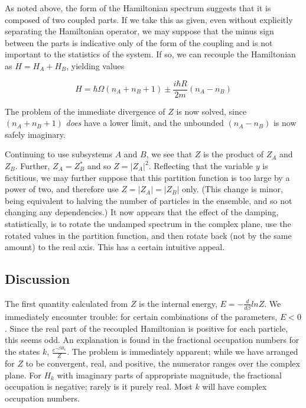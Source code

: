 As noted above, the form of the Hamiltonian spectrum suggests that it is
composed of two coupled parts.  If we take this as given, even without
explicitly separating the Hamiltonian operator, we may suppose that the
minus sign between the parts is indicative only of the form of the coupling
and is not important to the statistics of the system.  If so, we can recouple
the Hamiltonian as $H = H_{A} + H_{B}$, yielding values

\begin{equation}
H = \hbar \Omega (n_{A} + n_{B} + 1) \pm \frac{i \hbar R}{2 m} (n_{A} - n_{B})
\end{equation}

The problem of the immediate divergence of $Z$ is now solved, since $(n_{A} +
n_{B} + 1)$ {\em does} have a lower limit, and the unbounded $(n_{A} - n_{B})$
is now safely imaginary.

Continuing to use subsystems $A$ and $B$, we see
that $Z$ is the product of $Z_{A}$ and $Z_{B}$.  Further, $Z_{A} = Z_{B}^{*}$
and so $Z = |Z_{A}|^{2}$.  Reflecting that the variable $y$ is fictitious, we
may further suppose that this partition function is too large by a power of
two, and therefore use $Z = |Z_{A}| = |Z_{B}|$ only.  (This change is minor,
being equivalent to halving the number of particles in the ensemble, and so
not changing any dependencies.)  It now appears that the effect of the damping,
statistically, is to rotate the undamped spectrum in the complex plane, use
the rotated values in the partition function, and then rotate back (not by
the same amount) to the real axis.  This has a certain intuitive appeal.

\subsection{Discussion}

The first quantity calculated from $Z$ is the internal energy, $E = -
\frac{d}{d \beta} ln Z$.  We immediately encounter trouble:  for certain
combinations of the parameters, $E < 0$.  Since the real part of the recoupled
Hamiltonian is positive for each particle, this seems odd.  An explanation is
found in the fractional occupation numbers for the states $k$,
$\frac{e^{- \beta H_{k}}}{Z}$.  The problem is immediately apparent; while
we have arranged for $Z$ to be convergent, real, and positive, the numerator
ranges over the complex plane.  For $H_{k}$ with imaginary parts of appropriate
magnitude, the fractional occupation is negative; rarely is it purely real.
Most $k$ will have complex occupation numbers.


